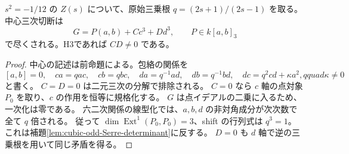 \begin{proposition}\label{prop:cubic-CY-one-segre-square-split-resonance}
$s^2=-1/12$ の $Z(s)$ について、原始三乗根 $q=(2s+1)/(2s-1)$ を取る。
中心三次切断は
\[
 G=P(a,b)+C c^3+D d^3,\qquad P\in k[a,b]_3
\]
で尽くされる。H3であれば $CD\ne0$ である。
\end{proposition}
\begin{proof}
中心の記述は前命題による。包絡の関係を
\[
 [a,b]=0,\quad ca=qac,\quad cb=qbc,\quad
 da=q^{-1}ad,\quad db=q^{-1}bd,\quad dc=q^2cd+\kappa a^2,qquad \kappa\ne0
\]
と書く。
$C=D=0$ は二元三次の分解で排除される。
$C=0$ なら $c$ 軸の点対象 $P_0$ を取り、$c$ の作用を恒等に規格化する。
$G$ は点イデアルの二乗に入るため、一次化は零である。
六二次関係の線型化では、$a,b,d$ の非対角成分が次次数で全て $q$ 倍される。
従って $\dim\operatorname{Ext}^1(P_0,P_0)=3$、shift の行列式は $q^3=1$。
これは補題\ref{lem:cubic-odd-Serre-determinant}に反する。
$D=0$ も $d$ 軸で逆の三乗根を用いて同じ矛盾を得る。
\end{proof}


